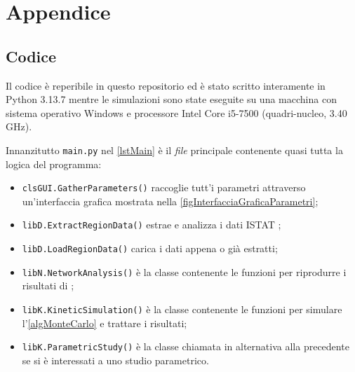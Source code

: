 

\appendix

\cleardoublepage
{}
{}
\chapter*{Appendice}

  \setcounter{section}{0}
  \renewcommand\thesection{\Alph{section}}
  \renewcommand\thesubsection{\thesection.\arabic{subsection}}
  \renewcommand\thefigure{\thesection.\arabic{figure}}



  \section{Codice}\label{apnCodice}

    Il codice è reperibile in questo repositorio \cite{Taralli2026} ed è stato scritto interamente in Python 3.13.7 mentre le simulazioni sono state eseguite su una macchina con sistema operativo Windows e processore Intel Core i5-7500 (quadri-nucleo, 3.40 GHz).
    
      Innanzitutto \texttt{main.py} nel \cref{lstMain} è il \textit{file} principale contenente quasi tutta la logica del programma:
  
      \begin{itemize}[
        label=\(\diamond\),
      ]
        \item \texttt{clsGUI.GatherParameters()} raccoglie tutt'i parametri attraverso un'interfaccia grafica mostrata nella \cref{figInterfacciaGraficaParametri};
        \item \texttt{libD.ExtractRegionData()} estrae e analizza i dati ISTAT \cite{ISTATLimiti1991,ISTATCensimento1991,ISTATPendolarismo1991};
        \item \texttt{libD.LoadRegionData()} carica i dati appena o già estratti;
        \item \texttt{libN.NetworkAnalysis()} è la classe contenente le funzioni per riprodurre i risultati di \cite{DeMontis2007};
        \item \texttt{libK.KineticSimulation()} è la classe contenente le funzioni per simulare l'\cref{algMonteCarlo} e trattare i risultati;
        \item \texttt{libK.ParametricStudy()} è la classe chiamata in alternativa alla precedente se si è interessati a uno studio parametrico\footnotemark{}.%
      \end{itemize}
  
